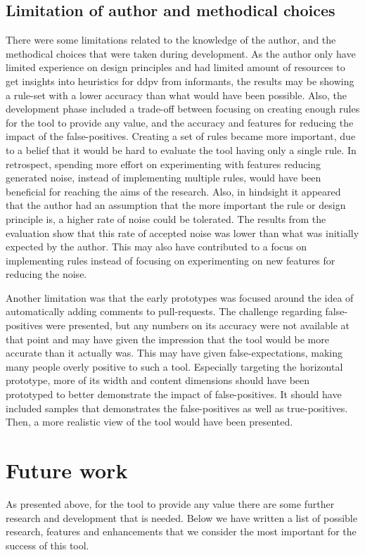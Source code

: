 \documentclass{report}
\begin{document}
\subsection*{Limitation of author and methodical choices}
There were some limitations related to the knowledge of the author, and the methodical choices that were taken during development. As the author only have limited experience on design principles and had limited amount of resources to get insights into heuristics for \gls{ddpv} from informants, the results may be showing a rule-set with a lower accuracy than what would have been possible. Also, the development phase included a trade-off between focusing on creating enough rules for the tool to provide any value, and the accuracy and features for reducing the impact of the false-positives. Creating a set of rules became more important, due to a belief that it would be hard to evaluate the tool having only a single rule. In retrospect, spending more effort on experimenting with features reducing generated noise, instead of implementing multiple rules, would have been beneficial for reaching the aims of the research. Also, in hindsight it appeared that the author had an assumption that the more important the rule or design principle is, a higher rate of noise could be tolerated. The results from the evaluation show that this rate of accepted noise was lower than what was initially expected by the author. This may also have contributed to a focus on implementing rules instead of focusing on experimenting on new features for reducing the noise. 

Another limitation was that the early prototypes was focused around the idea of automatically adding comments to pull-requests. The challenge regarding false-positives were presented, but any numbers on its accuracy were not available at that point and may have given the impression that the tool would be more accurate than it actually was. This may have given false-expectations, making many people overly positive to such a tool. Especially targeting the horizontal prototype, more of its width and content dimensions should have been prototyped to better demonstrate the impact of false-positives. It should have included samples that demonstrates the false-positives as well as true-positives. Then, a more realistic view of the tool would have been presented.



\section{Future work}
 As presented above, for the tool to provide any value there are some further research and development that is needed. Below we have written a list of possible research, features and enhancements that we consider the most important for the success of this tool. 
 
\end{document}
